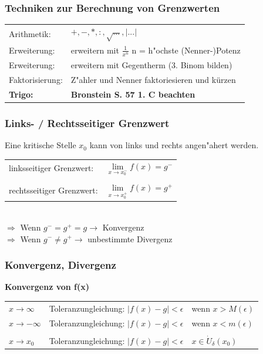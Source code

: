 		\subsubsection{Techniken zur Berechnung von Grenzwerten}	
			\begin{tabular}{ll}
				Arithmetik: & $+, -, *, :, \sqrt{...}, \vert ...\vert$ \\
				Erweiterung:& erweitern mit $\frac{1}{x^n}$ n = h"ochste (Nenner-)Potenz \\
				Erweiterung: & erweitern mit Gegentherm (3. Binom bilden)\\
				Faktorisierung: & Z"ahler und Nenner faktoriesieren und kürzen \\
				\textbf{Trigo:} & \textbf{Bronstein S. 57 1. C beachten}
			\end{tabular}
			
		\subsubsection{Links- / Rechtsseitiger Grenzwert}
			Eine kritische Stelle $x_0$ 	kann von links und rechts angen"ahert werden. \\
				
			\begin{tabular}{ll}
				linksseitiger Grenzwert: & $\lim\limits_{x \to x_0^-} f(x) = g^-$ \\
				\\
				rechtsseitiger Grenzwert: & $\lim\limits_{x \to x_0^+} f(x) = g^+$ \\
			\end{tabular}
			\\ 
			$\Rightarrow$ Wenn $g^- = g^+ = g \rightarrow$ Konvergenz  \\
			$\Rightarrow$ Wenn $g^- \neq g^+ \rightarrow$ unbestimmte Divergenz \\

		\subsubsection{Konvergenz, Divergenz}	
			\textbf{Konvergenz von f(x)} \\
		
				\begin{tabular}{lll}
					$x \rightarrow \infty$  & Toleranzungleichung: $\vert f(x) - g \vert < \epsilon$ & wenn $x > M(\epsilon)$ \\
					$x \rightarrow -\infty$ & Toleranzungleichung: $\vert f(x) - g \vert < \epsilon$ & wenn $x < m(\epsilon)$ \\
					\\
					$x \rightarrow x_0$     & Toleranzungleichung:  $\vert f(x) - g \vert < \epsilon$ & $ x \in \dot{U}_\delta(x_0)$ \\
				\end{tabular}
			
